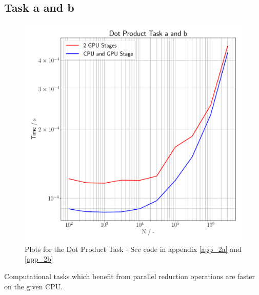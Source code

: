 \subsection{Task a and b}
\begin{figure}[h]
    \begin{center}
        \includegraphics[width=1\textwidth]{figures/dot_product.pdf}
        \caption{Plots for the Dot Product Task - See code in appendix \ref{app_2a} and \ref{app_2b}}
        \label{task_2_ab_plot}
    \end{center}
\end{figure}

Computational tasks which benefit from parallel reduction operations are faster on the given CPU.